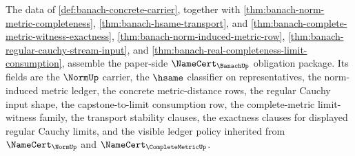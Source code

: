 \begin{theorem}
\label{thm:banach-namecert-obligation-package}
The data of \autoref{def:banach-concrete-carrier}, together with
\autoref{thm:banach-norm-metric-completeness},
\autoref{thm:banach-hsame-transport}, and
\autoref{thm:banach-complete-metric-witness-exactness},
\autoref{thm:banach-norm-induced-metric-row},
\autoref{thm:banach-regular-cauchy-stream-input}, and
\autoref{thm:banach-real-completeness-limit-consumption}, assemble the
paper-side $\NameCert_{\BanachUp}$ obligation package. Its fields are the
$\NormUp$ carrier, the $\hsame$ classifier on representatives, the
norm-induced metric ledger, the concrete metric-distance rows, the regular
Cauchy input shape, the capstone-to-limit consumption row, the
complete-metric limit-witness family, the transport stability clauses, the
exactness clauses for displayed regular Cauchy limits, and the visible ledger
policy inherited from
$\NameCert_{\NormUp}$ and $\NameCert_{\CompleteMetricUp}$.
\end{theorem}
